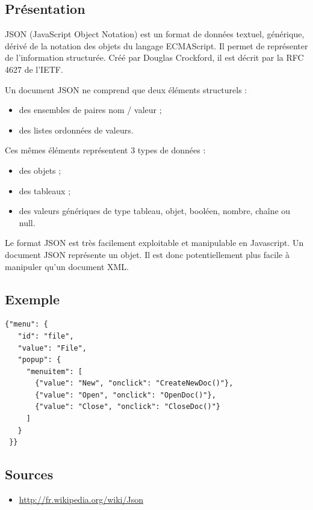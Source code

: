\documentclass[a4paper,10pt]{report}
\begin{document}
    \subsection{Présentation}

JSON (JavaScript Object Notation) est un format de données textuel, 
générique, dérivé de la notation des objets du langage ECMAScript. 
Il permet de représenter de l’information structurée. Créé par Douglas 
Crockford, il est décrit par la RFC 4627 de l’IETF.


Un document JSON ne comprend que deux éléments structurels : 
\begin{itemize}
 \item des ensembles de paires nom / valeur ; 
 \item des listes ordonnées de valeurs. 
\end{itemize}


Ces mêmes éléments représentent 3 types de données : 
\begin{itemize}
  \item des objets ; 
  \item des tableaux ; 
  \item des valeurs génériques de type tableau, objet, booléen, nombre, chaîne ou null. 
\end{itemize}

Le format JSON est très facilement exploitable et manipulable en Javascript. 
Un document JSON représente un objet. Il est donc potentiellement plus facile 
à manipuler qu'un document XML.

    \subsection{Exemple}

\begin{verbatim}
{"menu": {
   "id": "file",
   "value": "File",
   "popup": {
     "menuitem": [
       {"value": "New", "onclick": "CreateNewDoc()"},
       {"value": "Open", "onclick": "OpenDoc()"},
       {"value": "Close", "onclick": "CloseDoc()"}
     ]
   }
 }}
\end{verbatim}

    \subsection{Sources}

\begin{itemize}
 \item \url{http://fr.wikipedia.org/wiki/Json}
\end{itemize}
\end{document}
